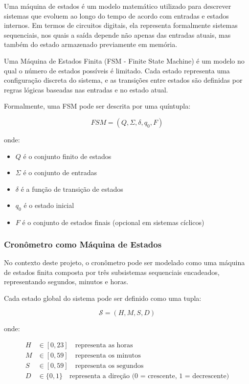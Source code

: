 \documentclass[a4paper,12pt]{article}
\begin{document}
Uma máquina de estados é um modelo matemático utilizado para descrever sistemas que evoluem ao longo do tempo de acordo com entradas e estados internos. Em termos de circuitos digitais, ela representa formalmente sistemas sequenciais, nos quais a saída depende não apenas das entradas atuais, mas também do estado armazenado previamente em memória.

Uma Máquina de Estados Finita (FSM - Finite State Machine) é um modelo no qual o número de estados possíveis é limitado. Cada estado representa uma configuração discreta do sistema, e as transições entre estados são definidas por regras lógicas baseadas nas entradas e no estado atual.

Formalmente, uma FSM pode ser descrita por uma quíntupla:

\[
FSM = (Q, \Sigma, \delta, q_0, F)
\]

onde:
\begin{itemize}
    \item $Q$ é o conjunto finito de estados
    \item $\Sigma$ é o conjunto de entradas
    \item $\delta$ é a função de transição de estados
    \item $q_0$ é o estado inicial
    \item $F$ é o conjunto de estados finais (opcional em sistemas cíclicos)
\end{itemize}

\subsubsection{Cronômetro como Máquina de Estados}

No contexto deste projeto, o cronômetro pode ser modelado como uma máquina de estados finita composta por três subsistemas sequenciais encadeados, representando segundos, minutos e horas.

Cada estado global do sistema pode ser definido como uma tupla:

\[
\mathcal{S} = (H, M, S, D)
\]

onde:

\begin{align*}
H &\in [0, 23] \quad \text{representa as horas} \\
M &\in [0, 59] \quad \text{representa os minutos} \\
S &\in [0, 59] \quad \text{representa os segundos} \\
D &\in \{0,1\} \quad \text{representa a direção (0 = crescente, 1 = decrescente)}
\end{align*}
\end{document}
